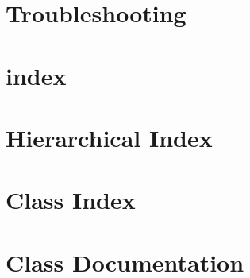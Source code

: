 \let\mypdfximage\pdfximage\def\pdfximage{\immediate\mypdfximage}\documentclass[twoside]{book}
\newcommand{\+}{\discretionary{\mbox{\scriptsize$\hookleftarrow$}}{}{}}
\newcommand{\clearemptydoublepage}{%
  \newpage{\pagestyle{empty}\cleardoublepage}%
}
\begin{document}
\chapter{Troubleshooting}
\label{md_lib_async_mqtt_client_master_docs_5___troubleshooting}

\chapter{index}
\label{md_lib_async_mqtt_client_master_docs_index}

\chapter{Hierarchical Index}

\chapter{Class Index}

\chapter{Class Documentation}


























\backmatter
\newpage
{}
\clearemptydoublepage
{}
\printindex
\end{document}
